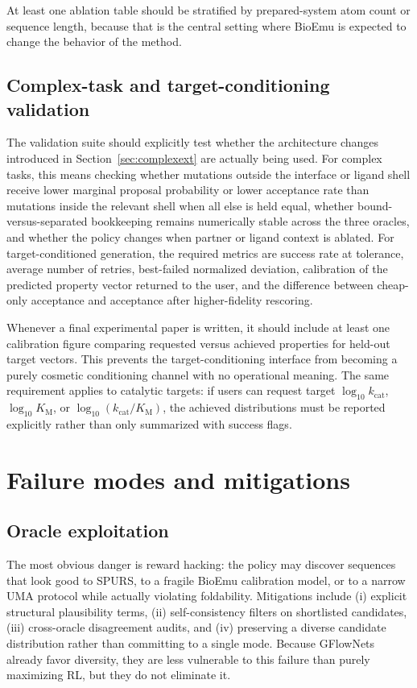 \documentclass[11pt]{article}
\newcommand{\logkcat}{\ensuremath{\log_{10} k_{\mathrm{cat}}}}
\newcommand{\logKm}{\ensuremath{\log_{10} K_{\mathrm M}}}
\newcommand{\logeff}{\ensuremath{\log_{10}(k_{\mathrm{cat}}/K_{\mathrm M})}}
\begin{document}
	At least one ablation table should be stratified by prepared-system atom count or sequence length, because that is the central setting where BioEmu is expected to change the behavior of the method.
	
	
	\subsection{Complex-task and target-conditioning validation}
	
	The validation suite should explicitly test whether the architecture changes introduced in Section~\ref{sec:complexext} are actually being used. For complex tasks, this means checking whether mutations outside the interface or ligand shell receive lower marginal proposal probability or lower acceptance rate than mutations inside the relevant shell when all else is held equal, whether bound-versus-separated bookkeeping remains numerically stable across the three oracles, and whether the policy changes when partner or ligand context is ablated. For target-conditioned generation, the required metrics are success rate at tolerance, average number of retries, best-failed normalized deviation, calibration of the predicted property vector returned to the user, and the difference between cheap-only acceptance and acceptance after higher-fidelity rescoring.
	
	Whenever a final experimental paper is written, it should include at least one calibration figure comparing requested versus achieved properties for held-out target vectors. This prevents the target-conditioning interface from becoming a purely cosmetic conditioning channel with no operational meaning. The same requirement applies to catalytic targets: if users can request target $\logkcat$, $\logKm$, or $\logeff$, the achieved distributions must be reported explicitly rather than only summarized with success flags.
	
	
	\section{Failure modes and mitigations}
	\label{sec:failure}
	
	\subsection{Oracle exploitation}
	
	The most obvious danger is reward hacking: the policy may discover sequences that look good to SPURS, to a fragile BioEmu calibration model, or to a narrow UMA protocol while actually violating foldability. Mitigations include (i) explicit structural plausibility terms, (ii) self-consistency filters on shortlisted candidates, (iii) cross-oracle disagreement audits, and (iv) preserving a diverse candidate distribution rather than committing to a single mode. Because GFlowNets already favor diversity, they are less vulnerable to this failure than purely maximizing RL, but they do not eliminate it.
	
\end{document}
